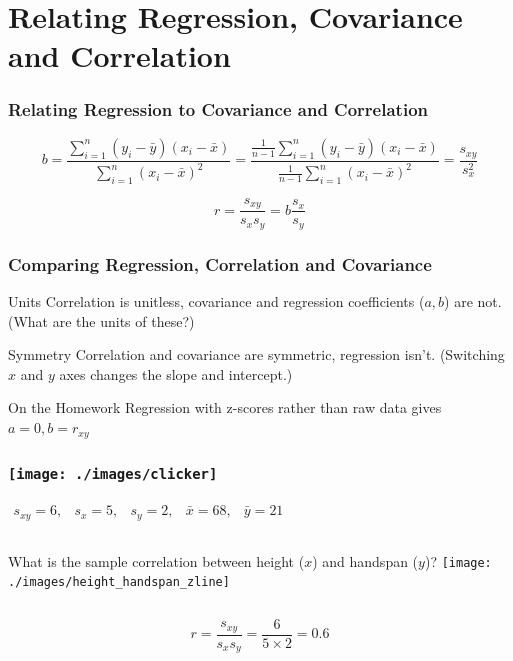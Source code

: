 \section{Relating Regression, Covariance and Correlation}
\begin{frame}
	\frametitle{Relating Regression to Covariance and Correlation}
		$$b = \frac{\sum_{i=1}^n \left(y_i - \bar{y}\right)\left(x_i - \bar{x} \right)}{\sum_{i=1}^n \left(x_i - \bar{x}\right)^2} = \frac{\frac{1}{n-1}\sum_{i=1}^n \left(y_i - \bar{y}\right)\left(x_i - \bar{x} \right)}{\frac{1}{n-1}\sum_{i=1}^n \left(x_i - \bar{x}\right)^2} = \frac{s_{xy}}{s_x^2}$$
		
		$$r = \frac{s_{xy}}{s_x s_y} = b \frac{s_x}{s_y}$$
		
\end{frame}
\begin{frame}
\frametitle{Comparing Regression, Correlation and Covariance}

\begin{block}{Units}
Correlation is unitless, covariance and regression coefficients ($a, b$) are not. (What are the units of these?)
\end{block}


\begin{block}{Symmetry}
Correlation and covariance are symmetric, regression isn't. (Switching $x$ and $y$ axes changes the slope and intercept.)
\end{block}

\begin{block}{On the Homework}
Regression with z-scores rather than raw data gives $a=0, b = r_{xy}$
\end{block}

\end{frame}

\begin{frame}
\frametitle{\texttt{[image: ./images/clicker]}}
$\begin{array}{ccccc} s_{xy} = 6,&s_x = 5,& s_y = 2,& \bar{x} = 68,& \bar{y} = 21\end{array}$
\begin{columns}[c]
\column{2.5in}
What is the sample correlation between height ($x$) and handspan ($y$)?
\column{1.8in}
\texttt{[image: ./images/height\_handspan\_zline]}
\end{columns}

\pause

\alert{$$r = \frac{s_{xy}}{s_x s_y} = \frac{6}{5\times 2} = 0.6$$}
\end{frame}

